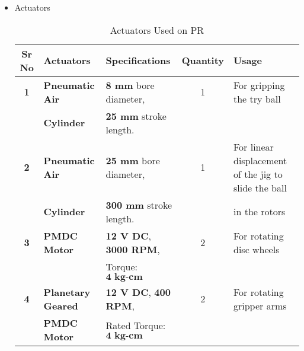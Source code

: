 \begin{itemize}
            \item Actuators
            \begin{table}[h]
                \caption {Actuators Used on PR} \label{Actuators_PR}  \small
                \begin{tabular}{|c|l|l|c|l|}
                    \hline  \hline
                    \textbf{Sr No}  & \textbf{Actuators}        & \textbf{Specifications}               & \textbf{Quantity}  & \textbf{Usage}                                               \\ \hline   \hline
                    \textbf{1}      & \textbf{Pneumatic Air}    & \textbf{8 mm} bore diameter,          & 1                  & For gripping the try ball                                    \\
                                    & \textbf{Cylinder}         & \textbf{25 mm} stroke length.         &                    &                                                              \\ \hline
                    \textbf{2}      & \textbf{Pneumatic Air}    & \textbf{25 mm} bore diameter,         & 1                  & For linear displacement of the jig to slide the ball         \\
                                    & \textbf{Cylinder}         & \textbf{300 mm} stroke length.        &                    & in the rotors                                                \\ \hline                                  
                    \textbf{3}      & \textbf{PMDC Motor}       & \textbf{12 V DC},  \textbf{3000 RPM}, & 2                  & For rotating disc wheels                                     \\
                                    &                           & Torque: $\textbf{4 kg-cm}$            &                    &                                                              \\ \hline 
                    \textbf{4}      & \textbf{Planetary Geared} & \textbf{12 V DC},  \textbf{400 RPM},  & 2                  & For rotating gripper arms                                    \\
                                    & \textbf{PMDC Motor}       & Rated Torque: $\textbf{4 kg-cm}$      &                    &                                                              \\ \hline   \hline   
                \end{tabular}
            \end{table}
        \end{itemize}


